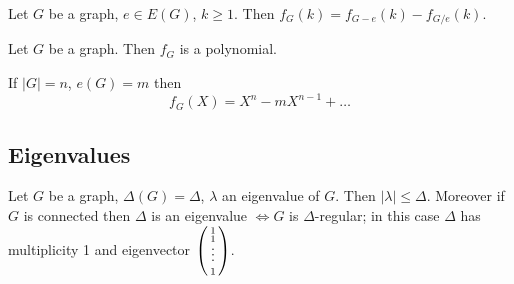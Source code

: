 \documentclass{article}
\begin{document}
\begin{nthm}\label{thm:43}
    Let $G$ be a graph, $e \in E(G)$, $k \geq 1$. Then $f_G(k) = f_{G-e}(k) - f_{G/e} (k)$.
\end{nthm}

\begin{ncor}\label{cor:44}
    Let $G$ be a graph. Then $f_G$ is a polynomial.
\end{ncor}














\begin{ncor}\label{cor:45}
    If $|G| = n$, $e(G) = m$ then
    \begin{equation*}
        f_G(X) = X^n - m X^{n-1} + \dotsc
    \end{equation*}
\end{ncor}

\subsection{Eigenvalues}































\begin{nthm}\label{thm:46}
    Let $G$ be a graph, $\Delta(G) = \Delta$, $\lambda$ an eigenvalue of $G$.
    Then $|\lambda| \leq \Delta$.
    Moreover if $G$ is connected then $\Delta$ is an eigenvalue $\iff G$ is $\Delta$-regular; in this case $\Delta$ has multiplicity 1 and eigenvector $\left(\begin{smallmatrix}1\\1\\  \vphantom{\int\limits^x}\smash{\vdots}\\1\end{smallmatrix}\right)$.
\end{nthm}
\end{document}

